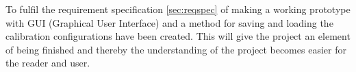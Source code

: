 To fulfil the requirement specification \ref{sec:reqspec} of making a working prototype with GUI (Graphical User Interface) and a method for saving and loading the calibration configurations have been created. This will give the project an element of being finished and thereby the understanding of the project becomes easier for the reader and user.